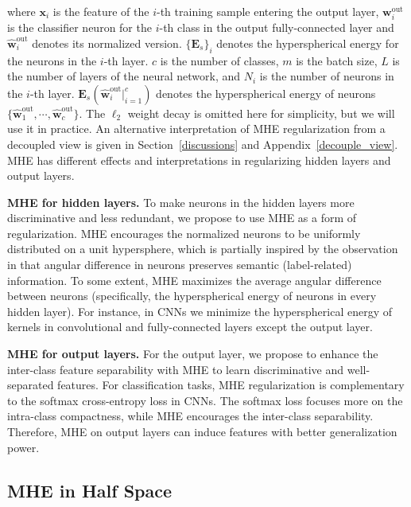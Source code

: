 where $\bm{x}_i$ is the feature of the $i$-th training sample entering the output layer, $\bm{w}^{\text{out}}_i$ is the classifier neuron for the $i$-th class in the output fully-connected layer and $\hat{\bm{w}}^{\text{out}}_i$ denotes its normalized version. $\{\bm{E}_s\}_i$ denotes the hyperspherical energy for the neurons in the $i$-th layer. $c$ is the number of classes, $m$ is the batch size, $L$ is the number of layers of the neural network, and $N_i$ is the number of neurons in the $i$-th layer. $\bm{E}_s(\hat{\bm{w}}^{\text{out}}_i|_{i=1}^c)$ denotes the hyperspherical energy of neurons $\{\hat{\bm{w}}^{\text{out}}_1,\cdots,\hat{\bm{w}}^{\text{out}}_c\}$. The $\ell_2$ weight decay is omitted here for simplicity, but we will use it in practice. An alternative interpretation of MHE regularization from a decoupled view is given in Section~\ref{discussions} and Appendix~\ref{decouple_view}. MHE has different effects and interpretations in regularizing hidden layers and output layers.
\par
\textbf{MHE for hidden layers.} To make neurons in the hidden layers more discriminative and less redundant, we propose to use MHE as a form of regularization. MHE encourages the normalized neurons to be uniformly distributed on a unit hypersphere, which is partially inspired by the observation in \cite{liu2017hyper} that angular difference in neurons preserves semantic (label-related) information. To some extent, MHE maximizes the average angular difference between neurons (specifically, the hyperspherical energy of neurons in every hidden layer). For instance, in CNNs we minimize the hyperspherical energy of kernels in convolutional and fully-connected layers except the output layer.
\par
\textbf{MHE for output layers.} For the output layer, we propose to enhance the inter-class feature separability with MHE to learn discriminative and well-separated features.  For classification tasks, MHE regularization is complementary to the softmax cross-entropy loss in CNNs. The softmax loss focuses more on the intra-class compactness, while MHE encourages the inter-class separability. Therefore, MHE on output layers can induce features with better generalization power.

\subsection{MHE in Half Space}

